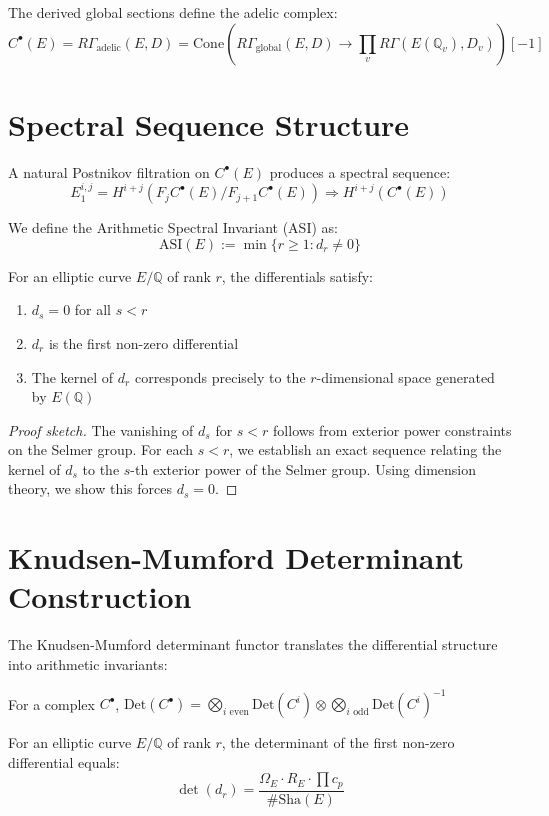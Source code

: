 \documentclass{article}
\begin{document}
The derived global sections define the adelic complex:
\[ C^\bullet(E) = R\Gamma_{\text{adelic}}(E, D) = \text{Cone}\left(R\Gamma_{\text{global}}(E, D) \to \prod_v R\Gamma(E(\mathbb{Q}_v), D_v)\right)[-1] \]

\section{Spectral Sequence Structure}

A natural Postnikov filtration on $C^\bullet(E)$ produces a spectral sequence:
\[ E_1^{i,j} = H^{i+j}(F_jC^\bullet(E)/F_{j+1}C^\bullet(E)) \Rightarrow H^{i+j}(C^\bullet(E)) \]

We define the Arithmetic Spectral Invariant (ASI) as:
\[ \text{ASI}(E) := \min\{r \geq 1 : d_r \neq 0\} \]

\begin{theorem}
For an elliptic curve $E/\mathbb{Q}$ of rank $r$, the differentials satisfy:
\begin{enumerate}
    \item $d_s = 0$ for all $s < r$
    \item $d_r$ is the first non-zero differential
    \item The kernel of $d_r$ corresponds precisely to the $r$-dimensional space generated by $E(\mathbb{Q})$
\end{enumerate}
\end{theorem}

\begin{proof}[Proof sketch]
The vanishing of $d_s$ for $s < r$ follows from exterior power constraints on the Selmer group.
For each $s < r$, we establish an exact sequence relating the kernel of $d_s$ to the $s$-th exterior
power of the Selmer group. Using dimension theory, we show this forces $d_s = 0$.
\end{proof}

\section{Knudsen-Mumford Determinant Construction}

The Knudsen-Mumford determinant functor translates the differential structure into arithmetic invariants:

For a complex $C^\bullet$, $\text{Det}(C^\bullet) = \bigotimes_{i \text{ even}} \text{Det}(C^i) \otimes \bigotimes_{i \text{ odd}} \text{Det}(C^i)^{-1}$

\begin{theorem}
For an elliptic curve $E/\mathbb{Q}$ of rank $r$, the determinant of the first non-zero differential equals:
\[ \det(d_r) = \frac{\Omega_E \cdot R_E \cdot \prod c_p}{\#\text{Sha}(E)} \]
\end{theorem}
\end{document}
